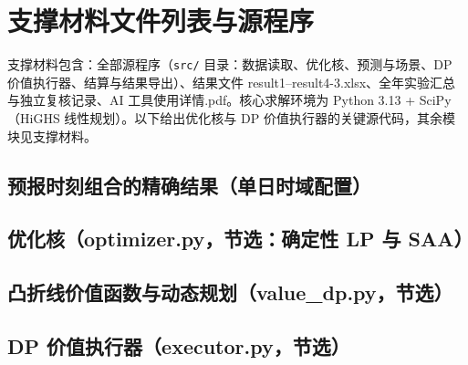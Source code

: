 \documentclass[withoutpreface,bwprint]{cumcmthesis}
\begin{document}
\section{支撑材料文件列表与源程序}
支撑材料包含：全部源程序（\texttt{src/} 目录：数据读取、优化核、预测与场景、DP 价值执行器、结算与结果导出）、结果文件 result1--result4-3.xlsx、全年实验汇总与独立复核记录、AI 工具使用详情.pdf。核心求解环境为 Python 3.13 + SciPy（HiGHS 线性规划）。以下给出优化核与 DP 价值执行器的关键源代码，其余模块见支撑材料。

\lstset{language=Python,basicstyle=\ttfamily\scriptsize,breaklines=true,
  numbers=left,numberstyle=\tiny,frame=single,tabsize=4,
  showstringspaces=false,columns=flexible}

\subsection{预报时刻组合的精确结果（单日时域配置）}

\FloatBarrier
\subsection{优化核（optimizer.py，节选：确定性 LP 与 SAA）}


\subsection{凸折线价值函数与动态规划（value\_dp.py，节选）}


\subsection{DP 价值执行器（executor.py，节选）}

\end{document}
